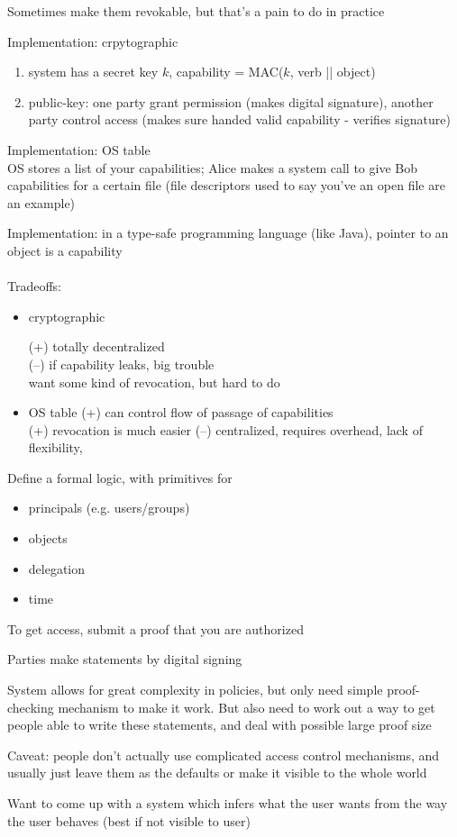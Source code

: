 Sometimes make them revokable, but that's a pain to do in practice

Implementation: crpytographic
\begin{enumerate}
    \item system has a secret key $k$, capability = MAC($k$, verb || object)
    \item public-key: one party grant permission (makes digital signature),
    another party control access (makes sure handed valid capability - verifies
    signature)
\end{enumerate}
Implementation: OS table\\
OS stores a list of your capabilities; Alice makes a system call to give Bob
capabilities for a certain file (file descriptors used to say you've an open
file are an example)

Implementation: in a type-safe programming language (like Java), pointer to an
object is a capability
\\
\\
Tradeoffs:
\begin{itemize}
    \item cryptographic

    (+) totally decentralized \\
    (--) if capability leaks, big trouble\\
    want some kind of revocation, but hard to do
    
    \item OS table
    (+) can control flow of passage of capabilities\\
    (+) revocation is much easier
    (--) centralized, requires overhead, lack of flexibility, 
\end{itemize}

Define a formal logic, with primitives for
\begin{itemize}
    \item principals (e.g. users/groups)
    \item objects
    \item delegation
    \item time
\end{itemize}
To get access, submit a proof that you are authorized

Parties make statements by digital signing

System allows for great complexity in policies, but only need simple proof-
checking mechanism to make it work. But also need to work out a way to get
people able to write these statements, and deal with possible large proof size

Caveat: people don't actually use complicated access control mechanisms, and
usually just leave them as the defaults or make it visible to the whole world

Want to come up with a system which infers what the user wants from the way the
user behaves (best if not visible to user)

